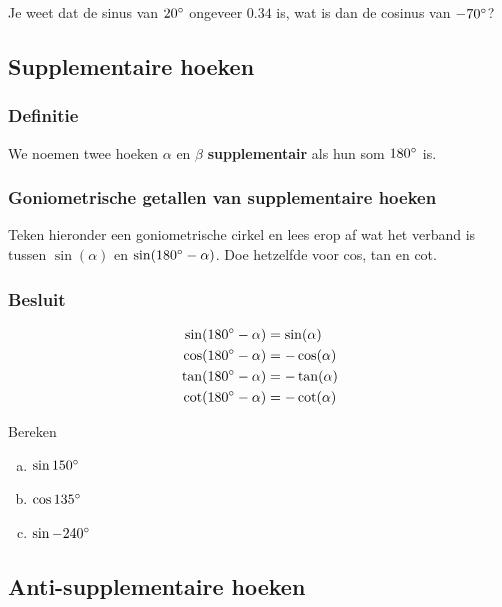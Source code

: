 \documentclass[a4paper,12pt]{article}
\begin{document}
\begin{oefening}
Je weet dat de sinus van $20^\circ$ ongeveer $0.34$ is, wat is dan de cosinus van $-70^\circ$?

\end{oefening}
\pagebreak
\subsection{Supplementaire hoeken}

\subsubsection*{Definitie}
We noemen twee hoeken $\alpha$ en $\beta$ \textbf{supplementair} als hun som $180^\circ$ is.

\subsubsection*{Goniometrische getallen van supplementaire hoeken}
Teken hieronder een goniometrische cirkel en lees erop af wat het verband is tussen $\sin(\alpha)$ en $\sin(180^\circ-\alpha)$. Doe hetzelfde voor cos, tan en cot.
\vspace*{7cm}
\subsubsection*{Besluit}
\begin{align*}
  \sin(180^\circ-\alpha)&=\sin(\alpha)\\
  \cos(180^\circ-\alpha)&=-\cos(\alpha)\\
  \tan(180^\circ-\alpha)&=-\tan(\alpha)\\
  \cot(180^\circ-\alpha)&=-\cot(\alpha)
\end{align*}

\begin{oefening}
Bereken
\begin{enumerate}[(a)]
  \item $\sin150^\circ$
  \item $\cos135^\circ$
  \item $\sin-240^\circ$
\end{enumerate}
\end{oefening}

\pagebreak
\subsection{Anti-supplementaire hoeken}
\end{document}
